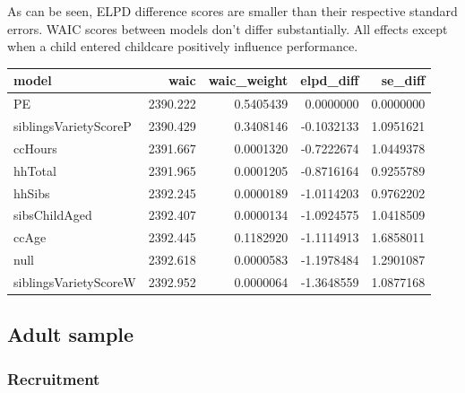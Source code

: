 \documentclass[
  man,floatsintext]{apa6}
\begin{document}
As can be seen, ELPD difference scores are smaller than their respective standard errors. WAIC scores between models don't differ substantially. All effects except when a child entered childcare positively influence performance.

\begin{tabular}{l|r|r|r|r}
\hline
model & waic & waic\_weight & elpd\_diff & se\_diff\\
\hline
PE & 2390.222 & 0.5405439 & 0.0000000 & 0.0000000\\
\hline
siblingsVarietyScoreP & 2390.429 & 0.3408146 & -0.1032133 & 1.0951621\\
\hline
ccHours & 2391.667 & 0.0001320 & -0.7222674 & 1.0449378\\
\hline
hhTotal & 2391.965 & 0.0001205 & -0.8716164 & 0.9255789\\
\hline
hhSibs & 2392.245 & 0.0000189 & -1.0114203 & 0.9762202\\
\hline
sibsChildAged & 2392.407 & 0.0000134 & -1.0924575 & 1.0418509\\
\hline
ccAge & 2392.445 & 0.1182920 & -1.1114913 & 1.6858011\\
\hline
null & 2392.618 & 0.0000583 & -1.1978484 & 1.2901087\\
\hline
siblingsVarietyScoreW & 2392.952 & 0.0000064 & -1.3648559 & 1.0877168\\
\hline
\end{tabular}

\hypertarget{adult-sample}{%
\subsection{Adult sample}\label{adult-sample}}

\hypertarget{recruitment}{%
\subsubsection{Recruitment}\label{recruitment}}
\end{document}
